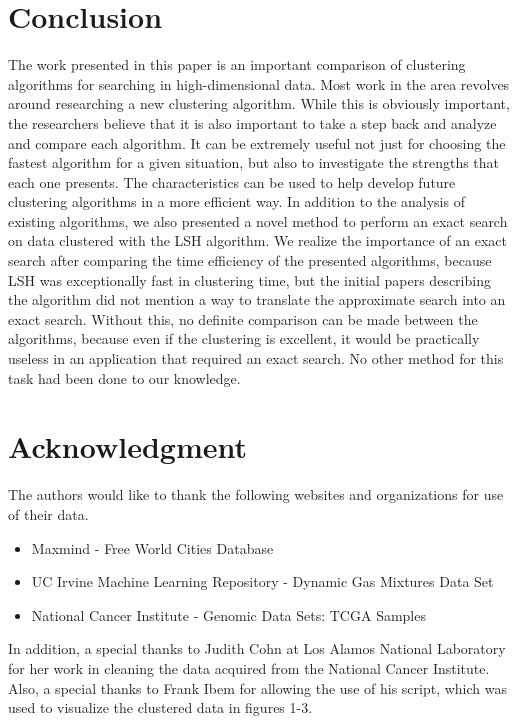 \documentclass[journal]{IEEEtran}
\begin{document}
\section{Conclusion}
The work presented in this paper is an important comparison of clustering algorithms for searching in high-dimensional data. Most work in the area revolves around researching a new clustering algorithm. While this is obviously important, the researchers believe that it is also important to take a step back and analyze and compare each algorithm. It can be extremely useful not just for choosing the fastest algorithm for a given situation, but also to investigate the strengths that each one presents. The characteristics can be used to help develop future clustering algorithms in a more efficient way. In addition to the analysis of existing algorithms, we also presented a novel method to perform an exact search on data clustered with the LSH algorithm. We realize the importance of an exact search after comparing the time efficiency of the presented algorithms, because LSH was exceptionally fast in clustering time, but the initial papers describing the algorithm did not mention a way to translate the approximate search into an exact search. Without this, no definite comparison can be made between the algorithms, because even if the clustering is excellent, it would be practically useless in an application that required an exact search. No other method for this task had been done to our knowledge.



\section*{Acknowledgment}
The authors would like to thank the following websites and organizations for use of their data.
\begin{itemize}
	\item Maxmind - Free World Cities Database
	\item UC Irvine Machine Learning Repository - Dynamic Gas Mixtures Data Set
	\item National Cancer Institute - Genomic Data Sets: TCGA Samples
\end{itemize}
In addition, a special thanks to Judith Cohn at Los Alamos National Laboratory for her work in cleaning the data acquired from the National Cancer Institute. Also, a special thanks to Frank Ibem for allowing the use of his script, which was used to visualize the clustered data in figures 1-3.
\end{document}

